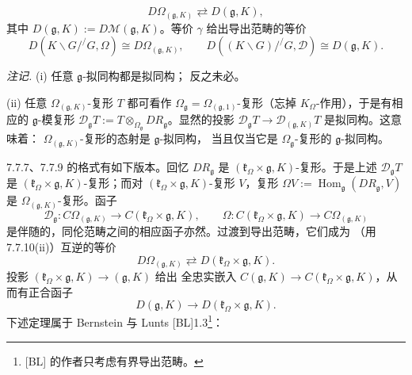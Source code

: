 
\begin{equation}\tag{326}
D\Omega_{(\mathfrak{g},K)}\rightleftarrows D(\mathfrak{g},K),
\end{equation}
其中 $D(\mathfrak{g},K):=D\mathcal{M}(\mathfrak{g},K)$。等价 $\gamma$
给出导出范畴的等价
\begin{equation}\tag{327}
D(K\backslash G/^{/}G,\Omega)\cong D\Omega_{(\mathfrak{g},K)},\qquad
D((K\backslash G)/^{/}G,\mathcal{D})\cong D(\mathfrak{g},K).
\end{equation}

 \emph{注记.} (i) 任意 $\mathfrak{g}$-拟同构都是拟同构；
反之未必。

(ii) 任意 $\Omega_{(\mathfrak{g},K)}$-复形 $T$ 都可看作
$\Omega_{\mathfrak{g}}=\Omega_{(\mathfrak{g},1)}$-复形（忘掉
$K_\Omega$-作用），于是有相应的 $\mathfrak{g}$-模复形
$\mathcal{D}_{\mathfrak{g}}T:=T\otimes_{\Omega_{\mathfrak{g}}}
DR_{\mathfrak{g}}$。显然的投影 $\mathcal{D}_{\mathfrak{g}}T\to
\mathcal{D}_{(\mathfrak{g},K)}T$ 是拟同构。这意味着：
$\Omega_{(\mathfrak{g},K)}$-复形的态射是 $\mathfrak{g}$-拟同构，
当且仅当它是 $\Omega_{\mathfrak{g}}$-复形的 $\mathfrak{g}$-拟同构。

 7.7.7、7.7.9 的格式有如下版本。回忆 $DR_{\mathfrak{g}}$ 是
$(\mathfrak{k}_\Omega\times\mathfrak{g},K)$-复形。于是上述
$\mathcal{D}_{\mathfrak{g}}T$ 是
$(\mathfrak{k}_\Omega\times\mathfrak{g},K)$-复形；而对
$(\mathfrak{k}_\Omega\times\mathfrak{g},K)$-复形 $V$，复形
$\Omega V:=\operatorname{Hom}_{\mathfrak{g}}(DR_{\mathfrak{g}},V)$ 是
$\Omega_{(\mathfrak{g},K)}$-复形。函子
\begin{equation}\tag{328}
\mathcal{D}_{\mathfrak{g}}:C\Omega_{(\mathfrak{g},K)}\longrightarrow
C(\mathfrak{k}_\Omega\times\mathfrak{g},K),\qquad
\Omega:C(\mathfrak{k}_\Omega\times\mathfrak{g},K)\longrightarrow
C\Omega_{(\mathfrak{g},K)}
\end{equation}
是伴随的，同伦范畴之间的相应函子亦然。过渡到导出范畴，它们成为
（用 7.7.10(ii)）互逆的等价
\begin{equation}\tag{329}
D\Omega_{(\mathfrak{g},K)}\rightleftarrows
D(\mathfrak{k}_\Omega\times\mathfrak{g},K).
\end{equation}
投影 $(\mathfrak{k}_\Omega\times\mathfrak{g},K)\to(\mathfrak{g},K)$ 给出
全忠实嵌入 $C(\mathfrak{g},K)\to
C(\mathfrak{k}_\Omega\times\mathfrak{g},K)$，从而有正合函子
\begin{equation}\tag{330}
D(\mathfrak{g},K)\longrightarrow
D(\mathfrak{k}_\Omega\times\mathfrak{g},K).
\end{equation}
下述定理属于 Bernstein 与 Lunts [BL]1.3\footnote{[BL] 的作者只考虑有界导出范畴。}：

